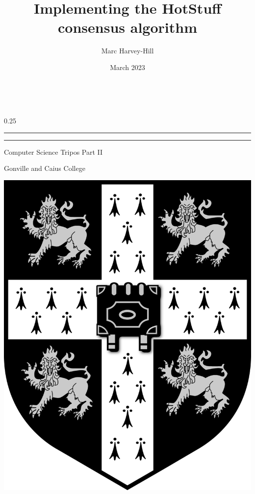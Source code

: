 \documentclass[12pt]{report}
\title{Implementing the HotStuff consensus algorithm}
\author{Marc Harvey-Hill}
\date{March 2023}
\makeatletter
\renewcommand\maketitle{{
    {\hfill \LARGE  \@author} \\[4ex]
    
    \begin{raggedright}
    
        {\setlength{\parindent}{0pt} \fontsize{40}{20} \renewcommand{\baselinestretch}{2} \bfseries \@title \par}

        \vspace{4ex}

        \begin{spacing} {0.25}
            \noindent\rule{\linewidth}{0.4pt} 
            \noindent\rule{\linewidth}{0.4pt}
        \end{spacing}

        \vspace{4ex}
        
        \LARGE Computer Science Tripos Part II

        \LARGE Gonville and Caius College
        
        \LARGE \@date
        
    \end{raggedright}
        
}}
\makeatother
\begin{document}
\begin{titlepage}
    \maketitle

    \vfill

    \noindent\includegraphics[scale=0.1]{university.png}


\end{titlepage}
\end{document}
